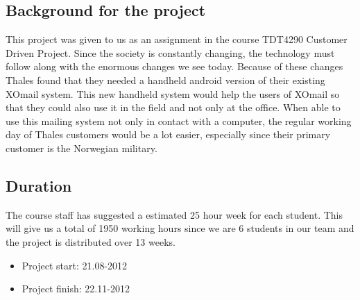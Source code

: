 \subsection{Background for the project}

This project was given to us as an assignment in the course TDT4290 Customer Driven Project. Since the society is constantly changing, the technology must follow along with the enormous changes we see today. Because of these changes Thales found that they needed a handheld android version of their existing XOmail system. This new handheld system would help the users of XOmail so that they could also use it in the field and not only at the office. When able to use this mailing system not only in contact with a computer, the regular working day of Thales customers would be a lot easier, especially since their primary customer is the Norwegian military.



\subsection{Duration}
The course staff has suggested a estimated 25 hour week for each student. This will give us a total of 1950 working hours since we are 6 students in our team and the project is distributed over 13 weeks.

\begin{itemize}
\item{}Project start: 21.08-2012
\item{}Project finish: 22.11-2012
\end{itemize}

